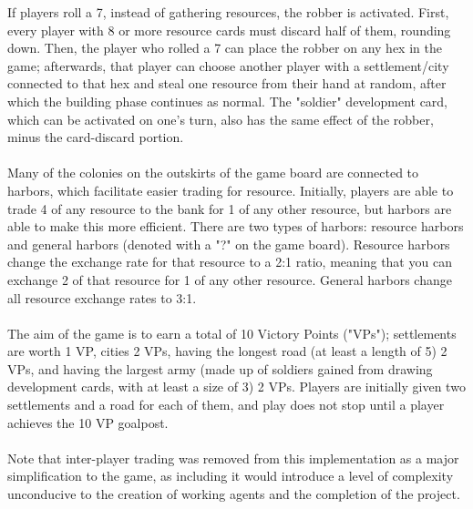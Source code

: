 \documentclass[a4paper, 11pt]{article}
\begin{document}
\noindent If players roll a 7, instead of gathering resources, the robber is activated. First, every player with 8 or more resource cards must discard half of them, rounding down. Then, the player who rolled a 7 can place the robber on any hex in the game; afterwards, that player can choose another player with a settlement/city connected to that hex and steal one resource from their hand at random, after which the building phase continues as normal. The "soldier" development card, which can be activated on one's turn, also has the same effect of the robber, minus the card-discard portion.
\\ \\
\noindent Many of the colonies on the outskirts of the game board are connected to harbors, which facilitate easier trading for resource. Initially, players are able to trade 4 of any resource to the bank for 1 of any other resource, but harbors are able to make this more efficient. There are two types of harbors: resource harbors and general harbors (denoted with a "?" on the game board). Resource harbors change the exchange rate for that resource to a 2:1 ratio, meaning that you can exchange 2 of that resource for 1 of any other resource. General harbors change all resource exchange rates to 3:1.
\\ \\
\noindent The aim of the game is to earn a total of 10 Victory Points ("VPs"); settlements are worth 1 VP, cities 2 VPs, having the longest road (at least a length of 5) 2 VPs, and having the largest army (made up of soldiers gained from drawing development cards, with at least a size of 3) 2 VPs. Players are initially given two settlements and a road for each of them, and play does not stop until a player achieves the 10 VP goalpost.
\\ \\
\noindent Note that inter-player trading was removed from this implementation as a major simplification to the game, as including it would introduce a level of complexity unconducive to the creation of working agents and the completion of the project.
\end{document}
